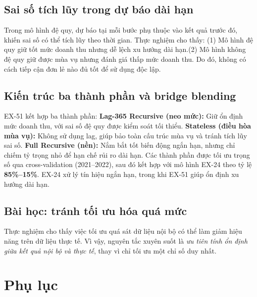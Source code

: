 \documentclass{article}
\begin{document}
\subsection{Sai số tích lũy trong dự báo dài hạn}
\label{sec:snowball}

Trong mô hình đệ quy, dự báo tại mỗi bước phụ thuộc vào kết quả trước đó, khiến sai số có thể tích lũy theo thời gian. Thực nghiệm cho thấy: (1) Mô hình đệ quy giữ tốt mức doanh thu nhưng dễ lệch xu hướng dài hạn.(2) Mô hình không đệ quy giữ được mùa vụ nhưng đánh giá thấp mức doanh thu. Do đó, không có cách tiếp cận đơn lẻ nào đủ tốt để sử dụng độc lập.

\subsection{Kiến trúc ba thành phần và bridge blending}
\label{sec:three_component}

EX-51 kết hợp ba thành phần:
\textbf{Lag-365 Recursive (neo mức):} Giữ ổn định mức doanh thu, với sai số đệ quy được kiểm soát tối thiểu.
\textbf{Stateless (điều hòa mùa vụ):} Không sử dụng lag, giúp bảo toàn cấu trúc mùa vụ và tránh tích lũy sai số.
\textbf{Full Recursive (nền):} Nắm bắt tốt biến động ngắn hạn, nhưng chỉ chiếm tỷ trọng nhỏ để hạn chế rủi ro dài hạn.
Các thành phần được tối ưu trọng số qua cross-validation (2021–2022), sau đó kết hợp với mô hình EX-24 theo tỷ lệ \textbf{85\%--15\%}. EX-24 xử lý tín hiệu ngắn hạn, trong khi EX-51 giúp ổn định xu hướng dài hạn.

\subsection{Bài học: tránh tối ưu hóa quá mức}

Thực nghiệm cho thấy việc tối ưu quá sát dữ liệu nội bộ có thể làm giảm hiệu năng trên dữ liệu thực tế. Vì vậy, nguyên tắc xuyên suốt là \textit{ưu tiên tính ổn định giữa kết quả nội bộ và thực tế}, thay vì chỉ tối ưu một chỉ số duy nhất.





\newpage
\appendix
\section{Phụ lục}
\end{document}
